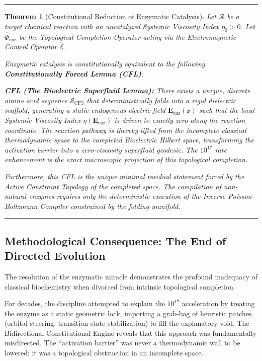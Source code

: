 \documentclass[11pt,openany]{extbook}
\theoremstyle{plain}
\newtheorem{theorem}{Theorem}[chapter]
\theoremstyle{definition}
\begin{document}
\begin{center}
\rule{0.8\textwidth}{0.4pt}
\end{center}

\begin{theorem}[Constitutional Reduction of Enzymatic Catalysis]
Let $\mathcal{R}$ be a target chemical reaction with an uncatalyzed Systemic Viscosity Index $\eta_0 > 0$. Let $\hat{\Phi}_{\text{enz}}$ be the Topological Completion Operator acting via the Electromagnetic Control Operator $\hat{\mathcal{E}}$.

Enzymatic catalysis is constitutionally equivalent to the following \textbf{Constitutionally Forced Lemma (CFL)}:

\textbf{CFL (The Bioelectric Superfluid Lemma):} \textit{There exists a unique, discrete amino acid sequence $\mathcal{S}_{\text{CFS}}$ that deterministically folds into a rigid dielectric scaffold, generating a static endogenous electric field $\mathbf{E}_{\text{enz}}(\mathbf{r})$ such that the local Systemic Viscosity Index $\eta(\mathbf{E}_{\text{enz}})$ is driven to exactly zero along the reaction coordinate. The reaction pathway is thereby lifted from the incomplete classical thermodynamic space to the completed Bioelectric Hilbert space, transforming the activation barrier into a zero-viscosity superfluid geodesic. The $10^{17}$ rate enhancement is the exact macroscopic projection of this topological completion.}

Furthermore, this CFL is the unique minimal residual statement forced by the Active Constraint Topology of the completed space. The compilation of non-natural enzymes requires only the deterministic execution of the Inverse Poisson-Boltzmann Compiler constrained by the folding manifold.
\end{theorem}

\begin{center}
\rule{0.8\textwidth}{0.4pt}
\end{center}

\subsection{Methodological Consequence: The End of Directed Evolution}
The resolution of the enzymatic miracle demonstrates the profound inadequacy of classical biochemistry when divorced from intrinsic topological completion.

For decades, the discipline attempted to explain the $10^{17}$ acceleration by treating the enzyme as a static geometric lock, importing a grab-bag of heuristic patches (orbital steering, transition state stabilization) to fill the explanatory void. The Bidirectional Constitutional Engine reveals that this approach was fundamentally misdirected. The ``activation barrier'' was never a thermodynamic wall to be lowered; it was a topological obstruction in an incomplete space.
\end{document}

